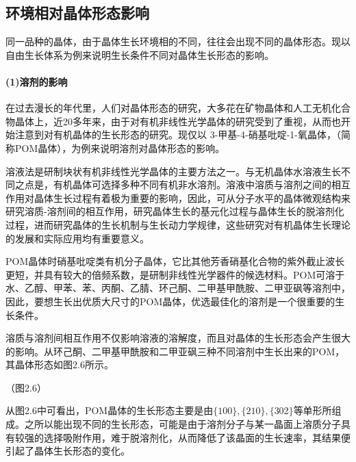 \subsection{环境相对晶体形态影响}
同一品种的晶体，由于晶体生长环境相的不同，往往会出现不同的晶体形态。现以自由生长体系为例来说明生长条件不同对晶体生长形态的影响。

\paragraph{(1)溶剂的影响}在过去漫长的年代里，人们对晶体形态的研究，大多花在矿物晶体和人工无机化合物晶体上，近20多年来，由于对有机非线性光学晶体的研究受到了重视，从而也开始注意到对有机晶体的生长形态的研究。现仅以{\CJKsetecglue{} 3-甲基-4-硝基吡啶-1-氧}晶体，（简称POM晶体），为例来说明溶剂对晶体形态的影响。

溶液法是研制块状有机非线性光学晶体的主要方法之一。与无机晶体水溶液生长不同之点是，有机晶体可选择多种不同有机非水溶剂。溶液中溶质与溶剂之间的相互作用对晶体生长过程有着极为重要的影响，因此，可从分子水平的晶体微观结构来研究{\CJKsetecglue{}溶质-溶剂}间的相互作用，研究晶体生长的基元化过程与晶体生长的脱溶剂化过程，进而研究晶体的生长机制与生长动力学规律，这些研究对有机晶体生长理论的发展和实际应用均有重要意义。

POM晶体时硝基吡啶类有机分子晶体，它比其他芳香硝基化合物的紫外截止波长更短，并具有较大的倍频系数，是研制非线性光学器件的候选材料。POM可溶于水、乙醇、甲苯、苯、丙酮、乙腈、环己酮、二甲基甲酰胺、二甲亚砜等溶剂中，因此，要想生长出优质大尺寸的POM晶体，优选最佳化的溶剂是一个很重要的生长条件。

溶质与溶剂间相互作用不仅影响溶液的溶解度，而且对晶体的生长形态会产生很大的影响。从环己酮、二甲基甲酰胺和二甲亚砜三种不同溶剂中生长出来的POM，其晶体形态如图2.6所示。

（图2.6）

从图2.6中可看出，POM晶体的生长形态主要是由$\{100\},\{210\},\{302\}$等单形所组成。之所以能出现不同的生长形态，可能是由于溶剂分子与某一晶面上溶质分子具有较强的选择吸附作用，难于脱溶剂化，从而降低了该晶面的生长速率，其结果便引起了晶体生长形态的变化。